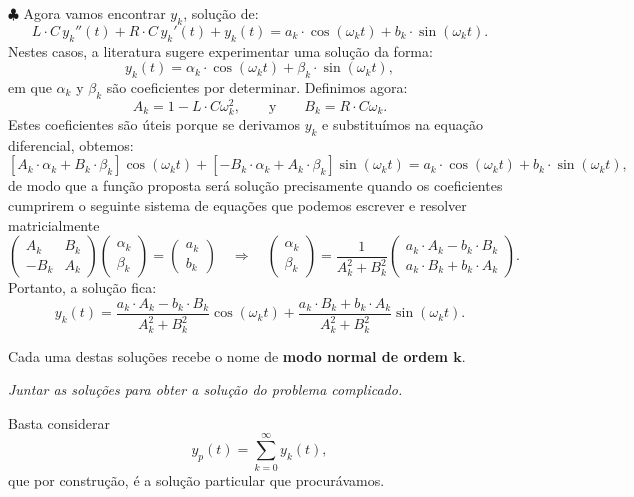 \begin{enumerate}[{\bfseries [1]}]
 $\clubsuit$ Agora vamos encontrar $y_{k}$, solução de:
\[
L\cdot C \,y_k '' (t) + R\cdot C\, y_k'(t) + y_k(t) = a_k\cdot \cos(\omega_kt) +  b_k\cdot \sin(\omega_kt) .
\]
Nestes casos, a literatura sugere experimentar uma solução da forma:
\[
y_{k}(t) = \alpha_k\cdot \cos(\omega_kt) + \beta_k\cdot \sin(\omega_kt),
\]
em que $\alpha_k$ y $\beta_k$ são coeficientes por determinar. Definimos agora:
\[
A_k = 1- L\cdot C\omega_k^2,\qquad\text{y}\qquad B_k = R\cdot C\omega_k.
\]
Estes coeficientes são úteis porque se derivamos $y_{k}$ e substituímos na equação diferencial, obtemos:
\[
 \left[A_k \cdot \alpha_k + B_k\cdot \beta_k\right] \cos(\omega_k t) + \left[-B_k \cdot \alpha_k + A_k\cdot \beta_k\right] \sin(\omega_k t) = a_k\cdot \cos(\omega_kt) +  b_k\cdot \sin(\omega_kt) ,
\]
de modo que a função proposta será solução precisamente quando os coeficientes cumprirem o seguinte sistema de equações que podemos escrever e resolver matricialmente
\[
\left(\begin{array}{cc}
A_k  & B_k\\
-B_k & A_k
\end{array}\right)
\left(\begin{array}{c}
 \alpha_k  \\
 \beta_k
\end{array}\right)
=
\left(\begin{array}{c}
 a_k  \\
 b_k
\end{array}\right)
%
\quad \Longrightarrow \quad
%
\left(\begin{array}{c}
 \alpha_k  \\
 \beta_k
\end{array}\right)
=
\frac{1}{A_k^2+B_k^2}
\left(\begin{array}{c}
 a_k\cdot A_k-b_k\cdot B_k \\
 a_k\cdot B_k + b_k\cdot A_k
\end{array}\right).
\] 
Portanto, a solução fica:
\begin{equation}
  \label{eq:ModoNormal}
  \boxed{
    y_k(t) = \frac{a_k\cdot A_k-b_k\cdot B_k}{A_k^2+B_k^2}\cos(\omega_kt) + \frac{a_k\cdot B_k + b_k\cdot A_k}{A_k^2+B_k^2}\sin(\omega_kt).
  }
\end{equation}

Cada uma destas soluções recebe o nome de \textbf{modo normal de ordem $\mathbf{k}$}.
 
  \item \textit{\color{blue}Juntar as soluções para obter a solução do problema complicado.}

Basta considerar
\[\boxed{
y_p (t)= \sum _{k=0}^{\infty} y_k (t),
}\]
que por construção, é a solução particular que procurávamos.
\end{enumerate}

